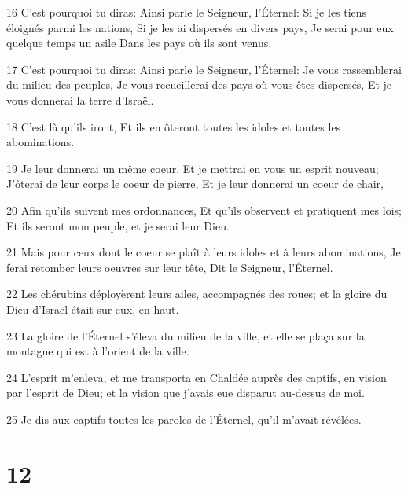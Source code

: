 \par 16 C'est pourquoi tu diras: Ainsi parle le Seigneur, l'Éternel: Si je les tiens éloignés parmi les nations, Si je les ai dispersés en divers pays, Je serai pour eux quelque temps un asile Dans les pays où ils sont venus.
\par 17 C'est pourquoi tu diras: Ainsi parle le Seigneur, l'Éternel: Je vous rassemblerai du milieu des peuples, Je vous recueillerai des pays où vous êtes dispersés, Et je vous donnerai la terre d'Israël.
\par 18 C'est là qu'ils iront, Et ils en ôteront toutes les idoles et toutes les abominations.
\par 19 Je leur donnerai un même coeur, Et je mettrai en vous un esprit nouveau; J'ôterai de leur corps le coeur de pierre, Et je leur donnerai un coeur de chair,
\par 20 Afin qu'ils suivent mes ordonnances, Et qu'ils observent et pratiquent mes lois; Et ils seront mon peuple, et je serai leur Dieu.
\par 21 Mais pour ceux dont le coeur se plaît à leurs idoles et à leurs abominations, Je ferai retomber leurs oeuvres sur leur tête, Dit le Seigneur, l'Éternel.
\par 22 Les chérubins déployèrent leurs ailes, accompagnés des roues; et la gloire du Dieu d'Israël était sur eux, en haut.
\par 23 La gloire de l'Éternel s'éleva du milieu de la ville, et elle se plaça sur la montagne qui est à l'orient de la ville.
\par 24 L'esprit m'enleva, et me transporta en Chaldée auprès des captifs, en vision par l'esprit de Dieu; et la vision que j'avais eue disparut au-dessus de moi.
\par 25 Je dis aux captifs toutes les paroles de l'Éternel, qu'il m'avait révélées.

\chapter{12}

